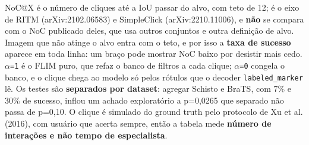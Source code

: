 \footnotesize NoC@X é o número de cliques até a IoU passar do alvo, com teto de 12; é o eixo de RITM (arXiv:2102.06583) e SimpleClick (arXiv:2210.11006), e \textbf{não} se compara com o NoC publicado deles, que usa outros conjuntos e outra definição de alvo. Imagem que não atinge o alvo entra com o teto, e por isso a \textbf{taxa de sucesso} aparece em toda linha: um braço pode mostrar NoC baixo por desistir mais cedo. \texttt{$\alpha$=1} é o FLIM puro, que refaz o banco de filtros a cada clique; \texttt{$\alpha$=0} congela o banco, e o clique chega ao modelo só pelos rótulos que o decoder \texttt{labeled\_marker} lê. Os testes são \textbf{separados por dataset}: agregar Schisto e BraTS, com 7\% e 30\% de sucesso, inflou um achado exploratório a p=0,0265 que separado não passa de p=0,10. O clique é simulado do ground truth pelo protocolo de Xu et al. (2016), com usuário que acerta sempre, então a tabela mede \textbf{número de interações e não tempo de especialista}.
\normalsize
